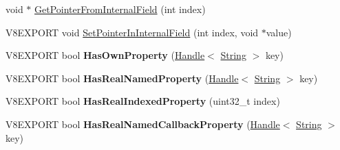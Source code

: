 \begin{DoxyCompactItemize}
\item 
void $\ast$ \hyperlink{classv8_1_1_object_a8ef1f3e0d4f4cecc54d5e0248bc45694}{Get\+Pointer\+From\+Internal\+Field} (int index)
\item 
V8\+E\+X\+P\+O\+R\+T void \hyperlink{classv8_1_1_object_a5e79966b79d69ef3a7b3b0d91414ec2c}{Set\+Pointer\+In\+Internal\+Field} (int index, void $\ast$value)
\item 
\hypertarget{classv8_1_1_object_a58cf9219dca36c4b17f02544c59a2549}{}V8\+E\+X\+P\+O\+R\+T bool {\bfseries Has\+Own\+Property} (\hyperlink{classv8_1_1_handle}{Handle}$<$ \hyperlink{classv8_1_1_string}{String} $>$ key)\label{classv8_1_1_object_a58cf9219dca36c4b17f02544c59a2549}

\item 
\hypertarget{classv8_1_1_object_ad5f2524b42102c4feb63fe5e17eaec83}{}V8\+E\+X\+P\+O\+R\+T bool {\bfseries Has\+Real\+Named\+Property} (\hyperlink{classv8_1_1_handle}{Handle}$<$ \hyperlink{classv8_1_1_string}{String} $>$ key)\label{classv8_1_1_object_ad5f2524b42102c4feb63fe5e17eaec83}

\item 
\hypertarget{classv8_1_1_object_ae1835a3c20cb3bf485e575f4c82aa5af}{}V8\+E\+X\+P\+O\+R\+T bool {\bfseries Has\+Real\+Indexed\+Property} (uint32\+\_\+t index)\label{classv8_1_1_object_ae1835a3c20cb3bf485e575f4c82aa5af}

\item 
\hypertarget{classv8_1_1_object_a7d3dbdffefc92245e04b0828aa0e770d}{}V8\+E\+X\+P\+O\+R\+T bool {\bfseries Has\+Real\+Named\+Callback\+Property} (\hyperlink{classv8_1_1_handle}{Handle}$<$ \hyperlink{classv8_1_1_string}{String} $>$ key)\label{classv8_1_1_object_a7d3dbdffefc92245e04b0828aa0e770d}


\end{DoxyCompactItemize}
